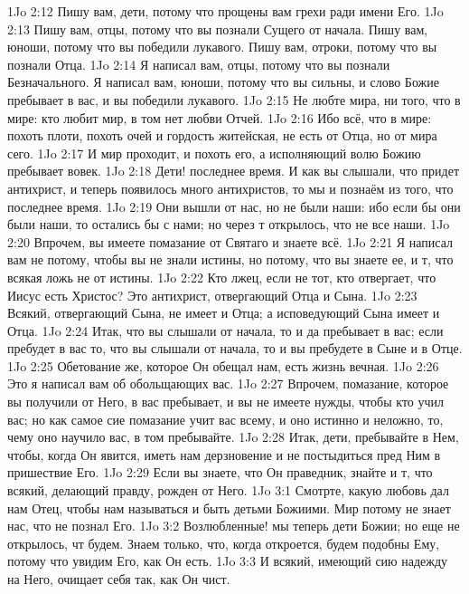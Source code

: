 \rsbpar\vs 1Jo 2:12 Пишу вам, дети, потому что прощены вам грехи ради имени Его.
\vs 1Jo 2:13 Пишу вам, отцы, потому что вы познали Сущего от начала. Пишу вам, юноши, потому что вы победили лукавого. Пишу вам, отроки, потому что вы познали Отца.
\vs 1Jo 2:14 Я написал вам, отцы, потому что вы познали Безначального. Я написал вам, юноши, потому что вы сильны, и слово Божие пребывает в вас, и вы победили лукавого.
\vs 1Jo 2:15 Не любте мира, ни того, что в мире: кто любит мир, в том нет любви Отчей.
\vs 1Jo 2:16 Ибо всё, что в мире: похоть плоти, похоть очей и гордость житейская, не есть от Отца, но от мира сего.
\vs 1Jo 2:17 И мир проходит, и похоть его, а исполняющий волю Божию пребывает вовек.
\rsbpar\vs 1Jo 2:18 Дети! последнее время. И как вы слышали, что придет антихрист, и теперь появилось много антихристов, то мы и познаём из того, что последнее время.
\vs 1Jo 2:19 Они вышли от нас, но не были наши: ибо если бы они были наши, то остались бы с нами; но  через т открылось, что не все наши.
\vs 1Jo 2:20 Впрочем, вы имеете помазание от Святаго и знаете всё.
\vs 1Jo 2:21 Я написал вам не потому, чтобы вы не знали истины, но потому, что вы знаете ее,  и т, что всякая ложь не от истины.
\vs 1Jo 2:22 Кто лжец, если не тот, кто отвергает, что Иисус есть Христос? Это антихрист, отвергающий Отца и Сына.
\vs 1Jo 2:23 Всякий, отвергающий Сына, не имеет и Отца; а исповедующий Сына имеет и Отца.
\vs 1Jo 2:24 Итак, что вы слышали от начала, то и да пребывает в вас; если пребудет в вас то, что вы слышали от начала, то и вы пребудете в Сыне и в Отце.
\vs 1Jo 2:25 Обетование же, которое Он обещал нам, есть жизнь вечная.
\rsbpar\vs 1Jo 2:26 Это я написал вам об обольщающих вас.
\vs 1Jo 2:27 Впрочем, помазание, которое вы получили от Него, в вас пребывает, и вы не имеете нужды, чтобы кто учил вас; но как самое сие помазание учит вас всему, и оно истинно и неложно, то, чему оно научило вас, в том пребывайте.
\rsbpar\vs 1Jo 2:28 Итак, дети, пребывайте в Нем, чтобы, когда Он явится, иметь нам дерзновение и не постыдиться пред Ним в пришествие Его.
\vs 1Jo 2:29 Если вы знаете, что Он праведник, знайте и т, что всякий, делающий правду, рожден от Него.
\vs 1Jo 3:1 Смотрте, какую любовь дал нам Отец, чтобы нам называться и быть детьми Божиими. Мир потому не знает нас, что не познал Его.
\rsbpar\vs 1Jo 3:2 Возлюбленные! мы теперь дети Божии; но еще не открылось, чт будем. Знаем только, что, когда откроется, будем подобны Ему, потому что увидим Его, как Он есть.
\vs 1Jo 3:3 И всякий, имеющий сию надежду на Него, очищает себя так, как Он чист.
